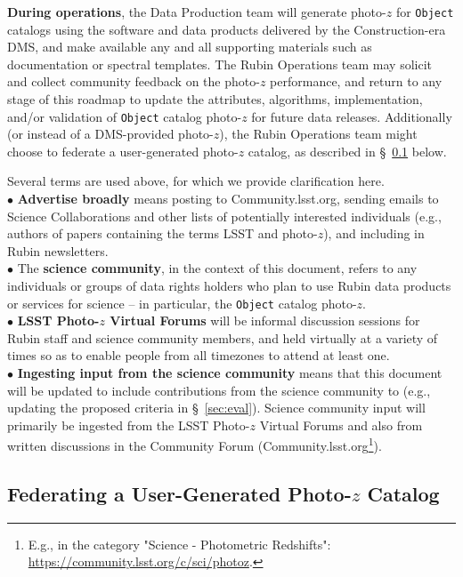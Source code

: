 \documentclass[DM,lsstdraft,toc]{lsstdoc}
\begin{document}
{\bf During operations}, the Data Production team will generate photo-$z$ for {\tt Object} catalogs using the software and data products delivered by the Construction-era DMS, and make available any and all supporting materials such as documentation or spectral templates.
The Rubin Operations team may solicit and collect community feedback on the photo-$z$ performance, and return to any stage of this roadmap to update the attributes, algorithms, implementation, and/or validation of {\tt Object} catalog photo-$z$ for future data releases.
Additionally (or instead of a DMS-provided photo-$z$), the Rubin Operations team might choose to federate a user-generated photo-$z$ catalog, as described in \S~\ref{ssec:time_ops_ugfed} below.

Several terms are used above, for which we provide clarification here. \\
$\bullet$ {\bf Advertise broadly} means posting to Community.lsst.org, sending emails to Science Collaborations and other lists of potentially interested individuals (e.g., authors of papers containing the terms LSST and photo-$z$), and including in Rubin newsletters. \\
$\bullet$ The {\bf science community}, in the context of this document, refers to any individuals or groups of data rights holders who plan to use Rubin data products or services for science -- in particular, the {\tt Object} catalog photo-$z$. \\
$\bullet$ {\bf LSST Photo-$z$ Virtual Forums} will be informal discussion sessions for Rubin staff and science community members, and held virtually at a variety of times so as to enable people from all timezones to attend at least one. \\
$\bullet$ {\bf Ingesting input from the science community} means that this document will be updated to include contributions from the science community to (e.g., updating the proposed criteria in \S~\ref{sec:eval}).
Science community input will primarily be ingested from the LSST Photo-$z$ Virtual Forums and also from written discussions in the Community Forum (Community.lsst.org\footnote{E.g., in the category "Science - Photometric Redshifts": \url{https://community.lsst.org/c/sci/photoz}.}).

\subsection{Federating a User-Generated Photo-$z$ Catalog}\label{ssec:time_ops_ugfed}
\end{document}
